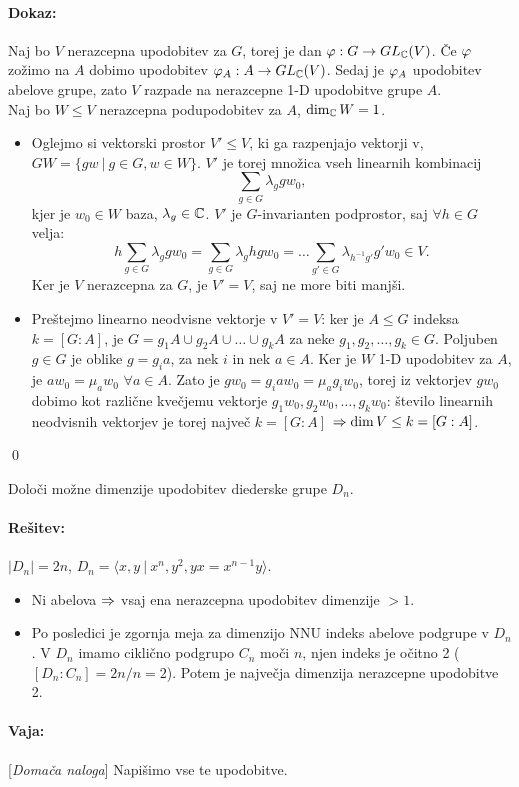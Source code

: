 \paragraph{Dokaz:}
Naj bo $V$ nerazcepna upodobitev za $G$, torej je dan $\varphi : G \to GL_{\mathbb{C}}(V)$. \v Ce $\varphi$ zo\v zimo na $A$ dobimo upodobitev
$\varphi_A : A \to GL_{\mathbb{C}}(V)$. Sedaj je $\varphi_A$ upodobitev abelove grupe, zato $V$ razpade na nerazcepne 1-D upodobitve grupe
$A$.\\

Naj bo $W \leq V$ nerazcepna podupodobitev za $A$, $\dim_{\mathbb{C}} W = 1$.
\begin{itemize}
	\item{Oglejmo si vektorski prostor $V' \leq V$, ki ga razpenjajo vektorji v, $GW = \{gw\ |\ g\in G, w \in W\}$.
		$V'$ je torej mno\v zica vseh linearnih kombinacij
		\[
			\sum_{g \in G} \lambda_g gw_0,
		\]
		kjer je $w_0 \in W$ baza, $\lambda_g \in \mathbb{C}$. $V'$ je $G$-invarianten podprostor, saj $\forall h \in G$
		velja:
		\[
			h \sum_{g \in G} \lambda_g gw_0 = \sum_{g \in G}\lambda_g hgw_0 = \ldots \sum_{g' \in G}\lambda_{h^{-1}g'}
				g'w_0 \in V.
		\]
		Ker je $V$ nerazcepna za $G$, je $V' = V$, saj ne more biti manj\v si.}
	\item{Pre\v stejmo linearno neodvisne vektorje v $V' = V$: ker je $A \leq G$ indeksa $k = [G : A]$, je
		$G = g_1 A \cup g_2 A \cup \ldots \cup g_k A$ za neke $g_1, g_2, \ldots, g_k \in G$. Poljuben $g \in G$ je
		oblike $g = g_i a$, za nek $i$ in nek $a \in A$. Ker je $W$ 1-D upodobitev za $A$, je $aw_0 = \mu_aw_0$
		$\forall a \in A$. Zato je $gw_0 = g_i a w_0 = \mu_a g_i w_0$, torej iz vektorjev $gw_0$ dobimo kot razli\v cne
		kve\v cjemu vektorje $g_1 w_0, g_2w_0, \ldots, g_kw_0$: \v stevilo linearnih neodvisnih vektorjev je torej
		najve\v c $k = [G : A]$ $\Rightarrow \dim V \leq k = [G : A]$.}
\end{itemize}
\qed

\begin{zgled}
	Dolo\v ci mo\v zne dimenzije upodobitev diederske grupe $D_n$.

	\paragraph{Re\v sitev:} $|D_n| = 2n$, $D_n = \langle x, y\ |\ x^n, y^2, yx = x^{n-1}y\rangle$.
	\begin{itemize}
		\item{Ni abelova $\Rightarrow$ vsaj ena nerazcepna upodobitev dimenzije $> 1$.}
		\item{Po posledici je zgornja meja za dimenzijo NNU indeks abelove podgrupe v $D_n$. V $D_n$ imamo cikli\v cno
			podgrupo $C_n$ mo\v ci $n$, njen indeks je o\v citno 2 ($[D_n : C_n] = 2n/n = 2$). Potem je
			najve\v cja dimenzija nerazcepne upodobitve 2.}
	\end{itemize}
	
	\paragraph{Vaja:} [\emph{Doma\v ca naloga}] Napi\v simo vse te upodobitve.
\end{zgled}

